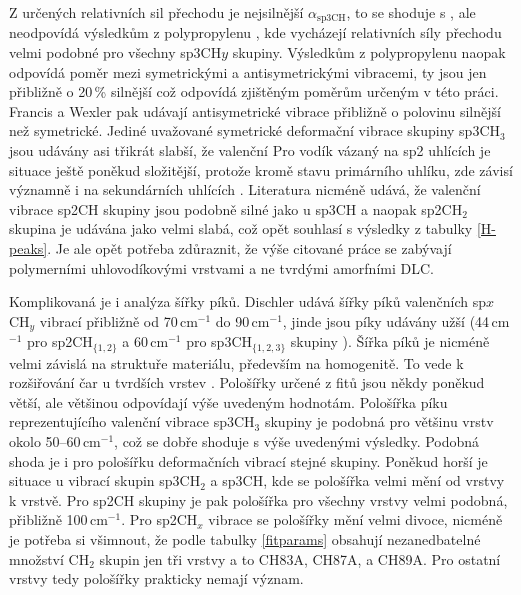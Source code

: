 Z určených relativních sil přechodu je nejsilnější $\alpha_\mathrm{sp3CH}$, to se shoduje s \cite{Francis1950, Wexler1967}, ale neodpovídá výsledkům z polypropylenu \cite{Heitz1998}, kde vycházejí relativních síly přechodu velmi podobné pro všechny sp3CH$y$ skupiny. Výsledkům z polypropylenu naopak odpovídá poměr mezi symetrickými a antisymetrickými vibracemi, ty jsou jen přibližně o 20\,\% silnější což odpovídá zjištěným poměrům určeným v této práci. Francis \cite{Francis1950} a Wexler \cite{Wexler1967} pak udávají antisymetrické vibrace přibližně o polovinu silnější než symetrické. Jediné uvažované symetrické deformační vibrace skupiny sp3CH$_3$ jsou udávány asi třikrát slabší, že valenční  
Pro vodík vázaný na sp2 uhlících je situace ještě poněkud složitější, protože kromě stavu primárního uhlíku, zde závisí významně i na sekundárních uhlících \cite{Heitz1998}. Literatura nicméně udává, že valenční vibrace sp2CH skupiny jsou podobně silné jako u sp3CH a naopak sp2CH$_2$ skupina je udávána jako velmi slabá, což opět souhlasí s výsledky z tabulky \ref{H-peaks}. Je ale opět potřeba zdůraznit, že výše citované práce se zabývají polymerními uhlovodíkovými vrstvami a ne tvrdými amorfními DLC.   

Komplikovaná je i analýza šířky píků. Dischler \cite{Dischler1983} udává šířky píků valenčních sp$x$CH$_y$ vibrací přibližně od 70\,cm$^{-1}$ do 90\,cm$^{-1}$, jinde jsou píky udávány užší (44\,cm$^{-1}$ pro sp2CH$_{\{1,2\}}$ a 60\,cm$^{-1}$ pro sp3CH$_{\{1,2,3\}}$ skupiny \cite{Zajickova2011}). Šířka píků je nicméně velmi závislá na struktuře materiálu, především na homogenitě. 
To vede k rozšiřování čar u tvrdších vrstev \cite{Ristein1998}. Pološířky určené z fitů jsou někdy poněkud větší, ale většinou odpovídají výše uvedeným hodnotám. Pološířka píku reprezentujícího valenční vibrace sp3CH$_3$ skupiny je podobná pro většinu vrstv okolo 50--60\,cm$^{-1}$, což se dobře shoduje s výše uvedenými výsledky. 
Podobná shoda je i pro pološířku deformačních vibrací stejné skupiny. Poněkud horší je situace u vibrací skupin sp3CH$_2$ a sp3CH, kde se pološířka velmi mění od vrstvy k vrstvě. Pro sp2CH skupiny je pak pološířka pro všechny vrstvy velmi podobná, přibližně 100\,cm$^{-1}$. Pro sp2CH$_x$ vibrace se pološířky mění velmi divoce, nicméně je potřeba si všimnout, že podle tabulky \ref{fitparams} obsahují nezanedbatelné množství CH$_2$ skupin jen tři vrstvy a to CH83A, CH87A, a CH89A. Pro ostatní vrstvy tedy pološířky prakticky nemají význam.

